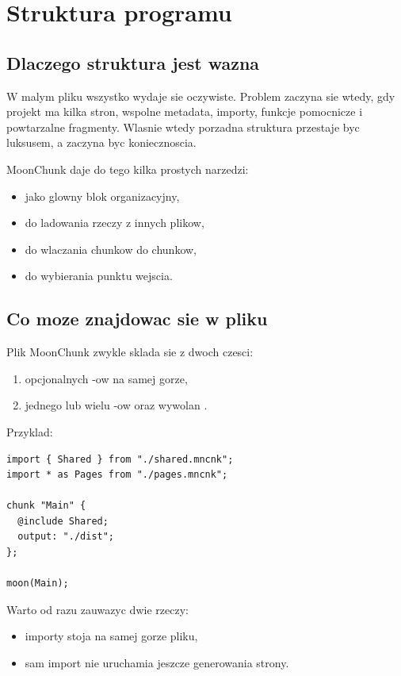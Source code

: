 \chapter{Struktura programu}

\section{Dlaczego struktura jest wazna}
W malym pliku wszystko wydaje sie oczywiste. Problem zaczyna sie wtedy, gdy projekt
ma kilka stron, wspolne metadata, importy, funkcje pomocnicze i powtarzalne fragmenty.
Wlasnie wtedy porzadna struktura przestaje byc luksusem, a zaczyna byc koniecznoscia.

MoonChunk daje do tego kilka prostych narzedzi:

\begin{itemize}
  \item {} jako glowny blok organizacyjny,
  \item {} do ladowania rzeczy z innych plikow,
  \item {} do wlaczania chunkow do chunkow,
  \item {} do wybierania punktu wejscia.
\end{itemize}

\section{Co moze znajdowac sie w pliku }
Plik MoonChunk zwykle sklada sie z dwoch czesci:

\begin{enumerate}
  \item opcjonalnych -ow na samej gorze,
  \item jednego lub wielu -ow oraz wywolan .
\end{enumerate}

Przyklad:

\begin{lstlisting}[style=moonchunk,caption={Typowy szkielet pliku MoonChunk}]
import { Shared } from "./shared.mncnk";
import * as Pages from "./pages.mncnk";

chunk "Main" {
  @include Shared;
  output: "./dist";
};

moon(Main);
\end{lstlisting}

Warto od razu zauwazyc dwie rzeczy:

\begin{itemize}
  \item importy stoja na samej gorze pliku,
  \item sam import nie uruchamia jeszcze generowania strony.
\end{itemize}

